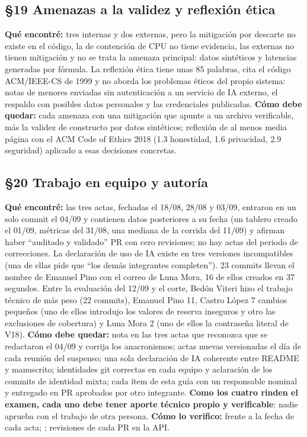 \subsection*{\S19 Amenazas a la validez y reflexi\'on \'etica}
\textbf{Qu\'e encontr\'e:} tres internas y dos externas, pero la mitigaci\'on por descarte no existe en el c\'odigo, la de contenci\'on de CPU no tiene evidencia, las externas no tienen mitigaci\'on y no se trata la amenaza principal: datos sint\'eticos y latencias generadas por f\'ormula. La reflexi\'on \'etica tiene unas 85 palabras, cita el c\'odigo ACM/IEEE-CS de 1999 y no aborda los problemas \'eticos del propio sistema: notas de menores enviadas sin autenticaci\'on a un servicio de IA externo, el respaldo con posibles datos personales y las credenciales publicadas. \textbf{C\'omo debe quedar:} cada amenaza con una mitigaci\'on que apunte a un archivo verificable, m\'as la validez de constructo por datos sint\'eticos; reflexi\'on de al menos media p\'agina con el ACM Code of Ethics 2018 (1.3 honestidad, 1.6 privacidad, 2.9 seguridad) aplicado a esas decisiones concretas.

\subsection*{\S20 Trabajo en equipo y autor\'ia}
\textbf{Qu\'e encontr\'e:} las tres actas, fechadas el 18/08, 28/08 y 03/09, entraron en un solo commit el 04/09 y contienen datos posteriores a su fecha (un tablero creado el 01/09, m\'etricas del 31/08, una mediana de la corrida del 11/09) y afirman haber ``auditado y validado'' PR con cero revisiones; no hay actas del periodo de correcciones. La declaraci\'on de uso de IA existe en tres versiones incompatibles (una de ellas pide que ``los dem\'as integrantes completen''). 23 commits llevan el nombre de Emanuel Pino con el correo de Luna Mora, 16 de ellos creados en 37 segundos. Entre la evaluaci\'on del 12/09 y el corte, Bed\'on Viteri hizo el trabajo t\'ecnico de m\'as peso (22 commits), Emanuel Pino 11, Castro L\'opez 7 cambios peque\~nos (uno de ellos introdujo los valores de reserva inseguros y otro las exclusiones de cobertura) y Luna Mora 2 (uno de ellos la contrase\~na literal de V18). \textbf{C\'omo debe quedar:} nota en las tres actas que reconozca que se redactaron el 04/09 y corrija los anacronismos; actas nuevas versionadas el d\'ia de cada reuni\'on del suspenso; una sola declaraci\'on de IA coherente entre README y manuscrito; identidades git correctas en cada equipo y aclaraci\'on de los commits de identidad mixta; cada \'item de esta gu\'ia con un responsable nominal y entregado en PR aprobados por otro integrante. \textbf{Como los cuatro rinden el examen, cada uno debe tener aporte t\'ecnico propio y verificable}: nadie aprueba con el trabajo de otra persona. \textbf{C\'omo lo verifico:}  frente a la fecha de cada acta; ; revisiones de cada PR en la API.

